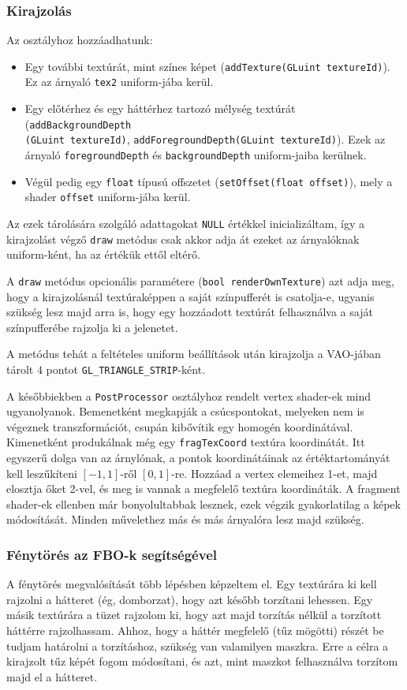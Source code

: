 \subsubsection{Kirajzolás}
Az osztályhoz hozzáadhatunk:
\begin{itemize}
\item Egy további textúrát, mint színes képet (\texttt{addTexture(GLuint textureId)}). Ez az árnyaló \texttt{tex2} uniform-jába kerül.
\item Egy előtérhez és egy háttérhez tartozó mélység textúrát (\texttt{addBackgroundDepth\\(GLuint textureId)}, \texttt{addForegroundDepth(GLuint textureId)}).  Ezek az árnyaló \texttt{foreground\-Depth} és \texttt{backgroundDepth} uniform-jaiba kerülnek.
\item Végül pedig egy \texttt{float} típusú offszetet (\texttt{setOffset(float offset)}), mely a shader \texttt{offset} uniform-jába kerül.
\end{itemize}
Az ezek tárolására szolgáló adattagokat \texttt{NULL} értékkel inicializáltam, így a kirajzolást végző \texttt{draw} metódus csak akkor adja át ezeket az árnyalóknak uniform-ként, ha az értékük ettől eltérő. 

A \texttt{draw} metódus opcionális paramétere (\texttt{bool renderOwnTexture}) azt adja meg, hogy a kirajzolásnál textúraképpen a saját színpufferét is csatolja-e, ugyanis szükség lesz majd arra is, hogy egy hozzáadott textúrát felhasználva a saját színpufferébe rajzolja ki a jelenetet.

A metódus tehát a feltételes uniform beállítások után kirajzolja a VAO-jában tárolt $4$ pontot \texttt{GL\_TRIANGLE\_STRIP}-ként.

A későbbiekben a \texttt{PostProcessor} osztályhoz rendelt vertex shader-ek mind ugyanolyanok. Bemenetként megkapják a csúcspontokat, melyeken nem is végeznek transzformációt, csupán kibővítik egy homogén koordinátával. Kimenetként produkálnak még egy \texttt{fragTexCoord} textúra koordinátát. Itt egyszerű dolga van az árnylónak, a pontok koordinátáinak az értéktartományát kell leszűkíteni $[-1, 1]$-ről $[0, 1]$-re. Hozzáad a vertex elemeihez 1-et, majd elosztja őket 2-vel, és meg is vannak a megfelelő textúra koordináták. A fragment shader-ek ellenben már bonyolultabbak lesznek, ezek végzik gyakorlatilag a képek módosítását. Minden művelethez más és más árnyalóra lesz majd szükség.

\subsubsection{Fénytörés az FBO-k segítségével}
A fénytörés megvalósítását több lépésben képzeltem el. Egy textúrára ki kell rajzolni a hátteret (ég, domborzat), hogy azt később torzítani lehessen. Egy másik textúrára a tüzet rajzolom ki, hogy azt majd torzítás nélkül a torzított háttérre rajzolhassam. Ahhoz, hogy a háttér megfelelő (tűz mögötti) részét be tudjam határolni a torzításhoz, szükség van valamilyen maszkra. Erre a célra a kirajzolt tűz képét fogom módosítani, és azt, mint maszkot felhasználva torzítom majd el a hátteret. 

